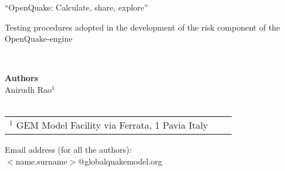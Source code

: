 \documentclass[11pt,fleqn]{book} %
\begin{document}


%


\begingroup
\thispagestyle{empty}
\par\normalfont\fontsize{15}{15}\sffamily\selectfont
“OpenQuake: Calculate, share, explore”
\centering
\vspace*{9cm}
\par\normalfont\fontsize{35}{35}\sffamily\selectfont
Testing procedures adopted in the development of the risk 
component of the OpenQuake-engine\par %
\endgroup


\newpage
~\vfill
\thispagestyle{empty}

\noindent
   \textbf{Authors} \\
   Anirudh Rao$^1$ \hfill \\
   \hfill \\
   \small
   \begin{tabular}{p{4cm}p{4cm}p{4cm}}
   $^1$ GEM Model Facility \hfill \newline
   via Ferrata, 1 \hfill \newline
   20133 Pavia \hfill \newline
   Italy \hfill \newline
   \end{tabular} \hfill \newline
   Email address (for all the authors):\hfill\\
   $<$name.surname$>$@globalquakemodel.org\hfill\\
   \normalsize
\end{document}
